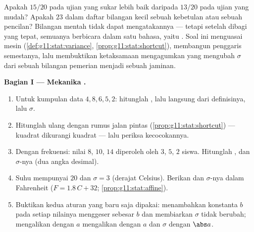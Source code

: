 \begin{problem}
\label{pb:g11:stat:1}
Apakah $15/20$ pada ujian yang sukar lebih baik daripada $13/20$ pada ujian
yang mudah? Apakah $23$ dalam daftar bilangan kecil sebuah kebetulan atau
sebuah pencilan? Bilangan mentah tidak dapat mengatakannya --- tetapi setelah
dibagi  yang tepat, semuanya berbicara dalam satu bahasa,
yaitu \emph{}. Soal ini menguasai mesin 
(\cref{def:g11:stat:variance},
\cref{prop:g11:stat:shortcut}), membangun penggaris semestanya, lalu
membuktikan ketaksamaan mengagumkan yang mengubah $\sigma$ dari sebuah bilangan
pemerian menjadi sebuah jaminan.

\medskip
\noindent\textbf{Bagian I --- Mekanika .}
\begin{enumerate}
  \item Untuk kumpulan data $4, 8, 6, 5, 2$: hitunglah , lalu
         langsung dari definisinya, lalu
        $\sigma$.
  \item Hitunglah ulang  dengan rumus jalan pintas
        (\cref{prop:g11:stat:shortcut}) ---  kuadrat
        dikurangi kuadrat  --- lalu periksa kecocokannya.
  \item Dengan frekuensi: nilai $8$, $10$, $14$ diperoleh oleh
        $3$, $5$, $2$ siswa. Hitunglah ,  dan
        $\sigma$-nya (dua angka desimal).
  \item Suhu mempunyai  $20$ dan $\sigma = 3$ (derajat
        Celsius). Berikan  dan $\sigma$-nya dalam Fahrenheit
        ($F = 1.8\,C + 32$; \cref{prop:g11:stat:affine}).
  \item Buktikan kedua aturan yang baru saja dipakai: menambahkan konstanta $b$
        pada setiap nilainya menggeser  sebesar $b$ dan membiarkan
        $\sigma$ tidak berubah; mengalikan dengan $a$ mengalikan 
        dengan $a$ dan $\sigma$ dengan $\abs a$.
\end{enumerate}


\end{problem}
